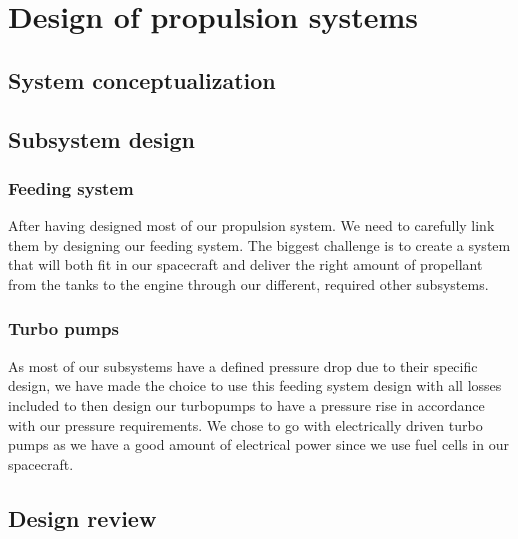 \chapter{Design of propulsion systems}
\section{System conceptualization}
\section{Subsystem design}
\subsection{Feeding system}
After having designed most of our propulsion system. We need to carefully link them by designing our feeding system. The biggest challenge is to create a system that will both fit in our spacecraft and deliver the right amount of propellant from the tanks to the engine through our different, required other subsystems. 

\subsection{Turbo pumps}
As most of our subsystems have a defined pressure drop due to their specific design, we have made the choice to use this feeding system design with all losses included to then design our turbopumps to have a pressure rise in accordance with our pressure requirements. We chose to go with electrically driven turbo pumps as we have a good amount of electrical power since we use fuel cells in our spacecraft.
\section{Design review}